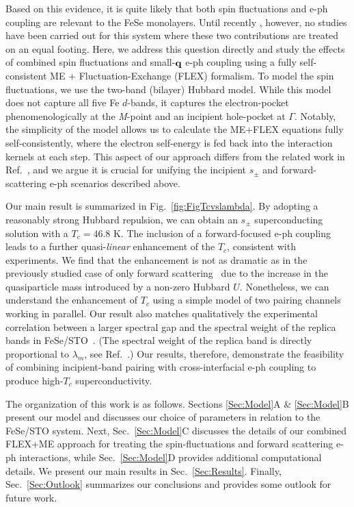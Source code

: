\documentclass[%
 reprint,
 superscriptaddress,
nofootinbib,
nobibnotes,
 amsmath,amssymb,
 aps,
 prb,
 dvipsnames, 
 floatfix
]{revtex4-2}
\newcommand{\eph}{e-ph}
\begin{document}
Based on this evidence, it is quite likely that both spin fluctuations and {\eph} coupling are relevant to the FeSe monolayers. Until recently \cite{Schrodi:2020bq}, however, no studies have been carried out for this system where these two contributions are treated on an equal footing. Here, we address this question directly and study the effects of combined spin fluctuations and small-${\bf q}$ {\eph} coupling using a fully self-consistent ME + Fluctuation-Exchange (FLEX) formalism. To model the spin fluctuations, we use the two-band (bilayer) Hubbard model. While this model does not capture all five Fe $d$-bands, it captures the electron-pocket phenomenologically at the \textit{M}-point and an incipient hole-pocket at $\Gamma$. Notably, the simplicity of the model allows us to calculate the ME+FLEX equations fully self-consistently, where the electron self-energy is fed back into the interaction kernels at each step. 
This aspect of our approach differs from the related work in Ref.~\cite{Schrodi:2020bq}, and we argue it is crucial for unifying the incipient $s_\pm$ and forward-scattering {\eph} scenarios described above. 

Our main result is summarized in Fig.~\ref{fig:FigTcvslambda}. By adopting a reasonably strong Hubbard repulsion, we can obtain an $s_\pm$ superconducting solution with a 
$T_c = 46.8$ K. The inclusion of a forward-focused {\eph} coupling leads to a further quasi-{\em linear} enhancement of the $T_c$, consistent with experiments. We find that the enhancement is not as dramatic as in the previously studied case of only forward scattering~\cite{Rademaker2016, WangSUST} due to the increase in the quasiparticle mass introduced by  a non-zero Hubbard $U$. Nonetheless, we can understand the enhancement of $T_c$ using a simple model of two pairing channels working in parallel. Our result also matches qualitatively the experimental correlation between a larger spectral gap and the spectral weight of the replica bands in FeSe/STO~\cite{Song:2019cg}. (The spectral weight of the replica band is directly proportional to $\lambda_m$, see Ref.~\cite{Rademaker2016}.) 
Our results, therefore, demonstrate the feasibility of combining incipient-band pairing with cross-interfacial {\eph} coupling to produce high-$T_c$ superconductivity. 

The organization of this work is as follows. Sections \ref{Sec:Model}A \& \ref{Sec:Model}B present our model and discusses our choice of parameters in relation to the FeSe/STO system. 
Next, Sec.~\ref{Sec:Model}C discusses the details of our combined FLEX+ME approach for treating the spin-fluctuations and forward scattering {\eph} interactions, while Sec.~\ref{Sec:Model}D provides additional computational details. We present our main results in Sec.~\ref{Sec:Results}. Finally, Sec.~\ref{Sec:Outlook} summarizes our conclusions and provides some outlook for future work. 
\end{document}
